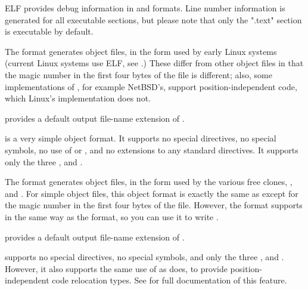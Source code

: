 ELF provides debug information in  and  formats.
Line number information is generated for all executable sections, but please
note that only the ".text" section is executable by default.


The  format generates  object files, in the
form used by early Linux systems (current Linux systems use ELF, see
.) These differ from other  object
files in that the magic number in the first four bytes of the file is
different; also, some implementations of , for example
NetBSD's, support position-independent code, which Linux's
implementation does not.

 provides a default output file-name extension of .

 is a very simple object format. It supports no special
directives, no special symbols, no use of  or , and no
extensions to any standard directives. It supports only the three
 , 
and .


The  format generates  object files, in the form
used by the various free  clones, , 
and . For simple object files, this object format is exactly
the same as  except for the magic number in the first four bytes
of the file. However, the  format supports
 in the same way as the
 format, so you can use it to write 
.

 provides a default output file-name extension of .

 supports no special directives, no special symbols, and
only the three  ,
 and . However, it also supports the same
use of  as  does, to provide position-independent
code relocation types. See  for full documentation
of this feature.

